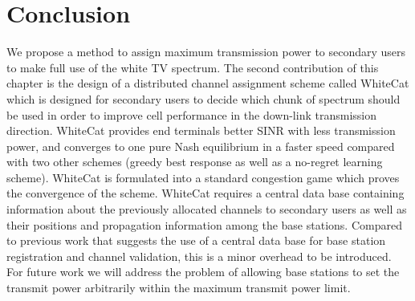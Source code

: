 \section{Conclusion}
We propose a method to assign maximum transmission power to secondary users to make full use of the white TV spectrum. The second contribution of this chapter is the design of a distributed channel assignment scheme called WhiteCat which is designed for secondary users to decide which chunk of spectrum should be used in order to improve cell performance in the down-link transmission direction. WhiteCat provides end terminals better SINR with less transmission power, and converges to one pure Nash equilibrium in a faster speed compared with two other schemes (greedy best response as well as a no-regret learning scheme). WhiteCat is formulated into a standard congestion game which proves the convergence of the scheme. WhiteCat requires a central data base containing information about the previously allocated channels to secondary users as well as their positions and propagation information among the base stations. Compared to previous work that suggests the use of a central data base for base station registration and channel validation, this is a minor overhead to be introduced. 
For future work we will address the problem of allowing base stations to set the transmit power arbitrarily within the maximum transmit power limit. 

